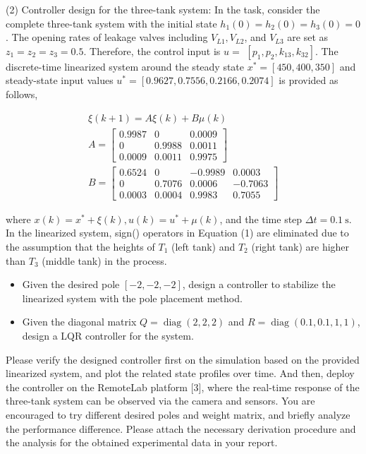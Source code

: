 \documentclass[10pt]{article}
\begin{document}
(2) Controller design for the three-tank system: In the task, consider the complete three-tank system with the initial state $h_{1}(0)=h_{2}(0)=h_{3}(0)=0$. The opening rates of leakage valves including $V_{L 1}, V_{L 2}$, and $V_{L 3}$ are set as $z_{1}=z_{2}=z_{3}=0.5$. Therefore, the control input is $u=$ $\left[p_{1}, p_{2}, k_{13}, k_{32}\right]$. The discrete-time linearized system around the steady state $x^{*}=[450,400,350]$ and steady-state input values $u^{*}=[0.9627,0.7556,0.2166,0.2074]$ is provided as follows,

$$
\begin{gathered}
\xi(k+1)=A \xi(k)+B \mu(k) \\
A=\left[\begin{array}{cccc}
0.9987 & 0 & 0.0009 \\
0 & 0.9988 & 0.0011 \\
0.0009 & 0.0011 & 0.9975
\end{array}\right] \\
B=\left[\begin{array}{cccc}
0.6524 & 0 & -0.9989 & 0.0003 \\
0 & 0.7076 & 0.0006 & -0.7063 \\
0.0003 & 0.0004 & 0.9983 & 0.7055
\end{array}\right]
\end{gathered}
$$

where $x(k)=x^{*}+\xi(k), u(k)=u^{*}+\mu(k)$, and the time step $\Delta t=0.1 \mathrm{~s}$. In the linearized system, sign() operators in Equation (1) are eliminated due to the assumption that the heights of $T_{1}$ (left tank) and $T_{2}$ (right tank) are higher than $T_{3}$ (middle tank) in the process.

\begin{itemize}
  \item Given the desired pole $[-2,-2,-2]$, design a controller to stabilize the linearized system with the pole placement method.
  \item Given the diagonal matrix $Q=\operatorname{diag}(2,2,2)$ and $R=\operatorname{diag}(0.1,0.1,1,1)$, design a LQR controller for the system.
\end{itemize}

Please verify the designed controller first on the simulation based on the provided linearized system, and plot the related state profiles over time. And then, deploy the controller on the RemoteLab platform [3], where the real-time response of the three-tank system can be observed via the camera and sensors. You are encouraged to try different desired poles and weight matrix, and briefly analyze the performance difference. Please attach the necessary derivation procedure and the analysis for the obtained experimental data in your report.
\end{document}

